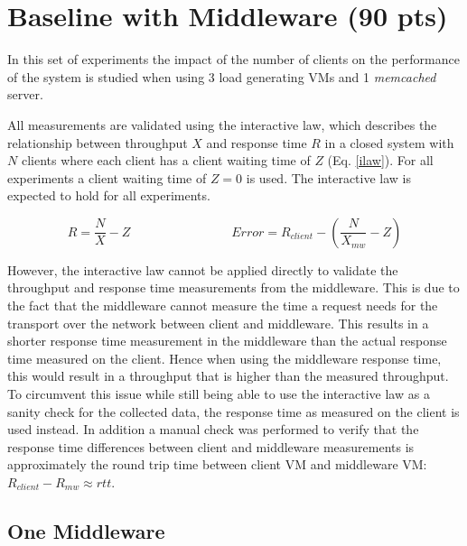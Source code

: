 \documentclass[report.tex]{subfiles}
\begin{document}
\section{Baseline with Middleware (90 pts)}\label{exp3}


In this set of experiments the impact of the number of clients on the  performance of the system is studied when using 3 load generating VMs and 1 \emph{memcached} server. 

All measurements are validated using the interactive law, which describes the relationship between throughput $X$ and response time $R$ in a closed system with $N$ clients where each client has a client waiting time of $Z$ (Eq. \ref{ilaw}). For all experiments a client waiting time of $Z = 0$ is used. The interactive law is expected to hold for all experiments.

\begin{equation}\label{ilaw}
R = \frac{N}{X} - Z
\qquad\qquad\qquad\qquad
Error = R_{client} - (\frac{N}{X_{mw}}  - Z)
\end{equation}

However, the interactive law cannot be applied directly to validate the throughput and response time measurements from the middleware.
This is due to the fact that the middleware cannot measure the time a request needs for the transport over the network between client and middleware. This results in a shorter response time measurement in the middleware than the actual response time measured on the client.
Hence when using the middleware response time, this would result in a throughput that is higher than the measured throughput.
To circumvent this issue while still being able to use the interactive law as a sanity check for the collected data, the response time as measured on the client is used instead. In addition a manual check was performed to verify that the response time differences between client and middleware measurements is approximately the round trip time between client VM and middleware VM: $R_{client} - R_{mw} \approx rtt$.


\subsection{One Middleware}\label{exp31}
\end{document}
